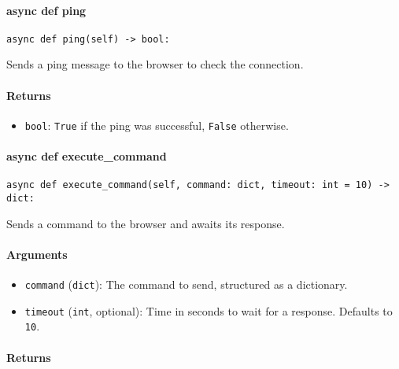 \documentclass{article}
\begin{document}
\paragraph{async def ping}

\begin{lstlisting}[style=pythonstyle]
async def ping(self) -> bool:
\end{lstlisting}

\noindent Sends a ping message to the browser to check the connection.

\paragraph{Returns}

\begin{itemize}
    \item \lstinline[style=pythonstyle]|bool|: \lstinline[style=pythonstyle]|True| if the ping was successful, \lstinline[style=pythonstyle]|False| otherwise.
\end{itemize}

\paragraph{async def execute\_command}

\begin{lstlisting}[style=pythonstyle]
async def execute_command(self, command: dict, timeout: int = 10) -> dict:
\end{lstlisting}

\noindent Sends a command to the browser and awaits its response.

\paragraph{Arguments}

\begin{itemize}
    \item \lstinline[style=pythonstyle]|command| (\lstinline[style=pythonstyle]|dict|): The command to send, structured as a dictionary.
    \item \lstinline[style=pythonstyle]|timeout| (\lstinline[style=pythonstyle]|int|, optional): Time in seconds to wait for a response. Defaults to \lstinline[style=pythonstyle]|10|.
\end{itemize}

\paragraph{Returns}
\end{document}
